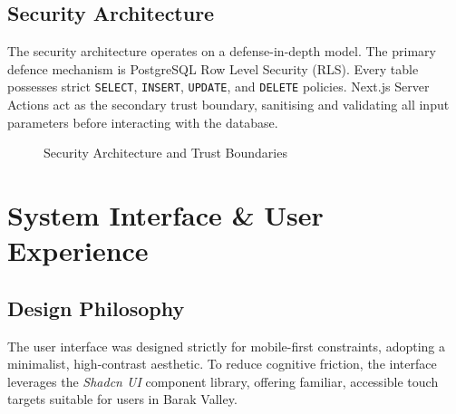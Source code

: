 \documentclass[12pt, a4paper, oneside]{report}
\begin{document}
\section{Security Architecture}
The security architecture operates on a defense-in-depth model. The primary defence mechanism is PostgreSQL Row Level Security (RLS). Every table possesses strict \texttt{SELECT}, \texttt{INSERT}, \texttt{UPDATE}, and \texttt{DELETE} policies. Next.js Server Actions act as the secondary trust boundary, sanitising and validating all input parameters before interacting with the database.

\begin{figure}[htbp]
    \centering
    \caption{Security Architecture and Trust Boundaries}
\end{figure}

\chapter{System Interface \& User Experience}

\section{Design Philosophy}
The user interface was designed strictly for mobile-first constraints, adopting a minimalist, high-contrast aesthetic. To reduce cognitive friction, the interface leverages the \textit{Shadcn UI} component library, offering familiar, accessible touch targets suitable for users in Barak Valley.
\end{document}
